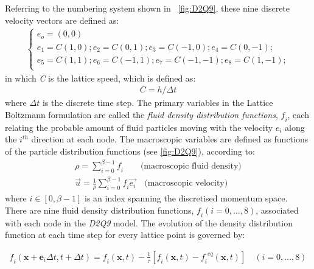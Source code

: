 Referring to the numbering system shown in ~\cref{fig:D2Q9}, these nine discrete velocity vectors are defined as:
\begin{align} 
\begin{cases}
\mathit{e_o}=(0,0)\\
\mathit{e_1}=\mathit{C}(1,0); \mathit{e_2}=\mathit{C}(0,1); \mathit{e_3}=\mathit{C}(-1,0); \mathit{e_4}=\mathit{C}(0,-1); \\
\mathit{e_5}=\mathit{C}(1,1); \mathit{e_6}=\mathit{C}(-1,1); \mathit{e_7}=\mathit{C}(-1,-1); \mathit{e_8}=\mathit{C}(1,-1); \\ 
\end{cases}
\end{align}
in which \textit{C} is the lattice speed, which is defined as:
\begin{align}
\mathit{C}=\mathit{h}/\Delta t
\end{align}
where $\Delta \mathit{t}$ is the discrete time step. The primary variables in the Lattice Boltzmann formulation are called the \textit{fluid density distribution functions}, $\mathit{f_i}$, each relating the probable amount of fluid particles moving with the velocity $\mathit{e_i}$ along the $\mathit{i^{th}}$ direction at each node. The macroscopic variables are defined as functions of the particle distribution functions (see \cref{fig:D2Q9}), according to:
\begin{align} 
 \nonumber
\rho = \sum\limits_{\mathit{i}=0}^{\beta - 1}{\mathit{f_i}} \qquad \mbox{(macroscopic fluid density)} \\
\overrightarrow{\mathit{u}} = \frac{1}{\rho} \sum\limits_{\mathit{i}=0}^{\beta -1}{\mathit{f_i}\overrightarrow{\mathit{e_i}}} \quad \mbox{(macroscopic velocity)}
\label{eq:lbm_macroscopic}
\end{align} 
where $\mathit{i} \in [0, \beta -1]$ is an index spanning the discretised momentum space. There are nine fluid density distribution functions, $\mathit{f_i}(\mathit{i}=0,\dots,8)$, associated with each node in the \textit{D2Q9} model. The evolution of the density distribution function at each time step for every lattice point is governed by:

\begin{align} 
\label{eq:stream}
\mathit{f_i}(\mathbf{x}+\mathbf{e}_{\mathit{i}} \Delta t, t + \Delta t) = \mathit{f_i}(\mathbf{x},t) - \frac{1}{\tau} [\mathit{f_i}(\mathbf{x},t) -\mathit{f_i}^{\mathit{eq}}(\mathbf{x},t)] \quad (\mathit{i}=0,\dots,8)
\end{align}

